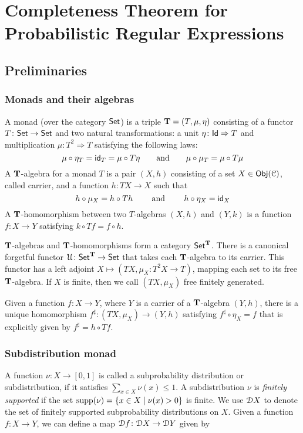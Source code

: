 \chapter{Completeness Theorem for Probabilistic Regular Expressions}
\label{chapter4}

\section{Preliminaries}
\label{c4:sec:preliminaries}
\subsection{Monads and their algebras}\label{c4:subsec:monads}
A monad (over the category ${\mathsf{Set}}$) is a triple $\mathbf{T} = (T, \mu, \eta)$ consisting of a functor $T \colon {\mathsf{Set}} \to {\mathsf{Set}}$ and two natural transformations: a unit $\eta \colon \mathsf{Id} \Rightarrow T$ and multiplication $\mu \colon T^2 \Rightarrow T$ satisfying the following laws:
$$\mu \circ \eta_T = \mathsf{id}_T=  \mu \circ T\eta \qquad \text{and} \qquad \mu \circ \mu_T = \mu \circ T \mu$$
A $\mathbf{T}$-algebra for a monad $T$ is a pair $(X, h)$ consisting of a set $X \in \mathsf{Obj}(\mathcal{C})$, called carrier, and a function $h \colon T X \to X$ such that 
$$
h \circ \mu_X = h \circ Th \qquad \text{ and }\qquad h \circ \eta_X = \mathsf{id}_X
$$
A $\mathbf{T}$-homomorphism between two $T$-algebras $(X,h)$ and $(Y,k)$ is a function 	$f \colon X \to Y$ satisfying $k \circ Tf = f \circ h$.

$\mathbf{T}$-algebras and $\mathbf{T}$-homomorphisms form a category ${\mathsf{Set}}^{\mathbf{T}}$. There is a canonical forgetful functor $\mathcal{U} \colon {\mathsf{Set}}^{\mathbf{T}} \to {\mathsf{Set}}$ that takes each $\mathbf{T}$-algebra to its carrier. This functor has a left adjoint $X \mapsto (TX, \mu_X \colon T^2 X \to T)$, mapping each set to its free $\mathbf{T}$-algebra. If $X$ is finite, then we call $(TX, \mu_X)$ free finitely generated.

Given a function $f \colon X \to Y$, where $Y$ is a carrier of a $\mathbf{T}$-algebra $(Y, h)$, there is a unique homomorphism $f^\sharp \colon (TX, \mu_X) \to (Y,h)$ satisfying $f^\sharp \circ \eta_X = f$ that is explicitly given by $f^\sharp = h \circ Tf$.

\subsection{Subdistribution monad}\label{c4:subsec:subdistribution}
 A function $\nu : X \to [0,1]$ is called a subprobability distribution or subdistribution, if it satisfies $\sum_{x \in X} \nu(x) \leq 1$. A subdistribution $\nu$ is \emph{finitely supported}  if the set $\operatorname{supp}(\nu) = \{x \in X \mid \nu(x) > 0\}$ is finite. We use $\mathcal{D} {X}$ to denote the set of finitely supported subprobability distributions on $X$. Given a function $f \colon X \to Y$, we can define a map $\mathcal{D} f \colon \mathcal{D} X \to \mathcal{D} Y$ given by 
 
